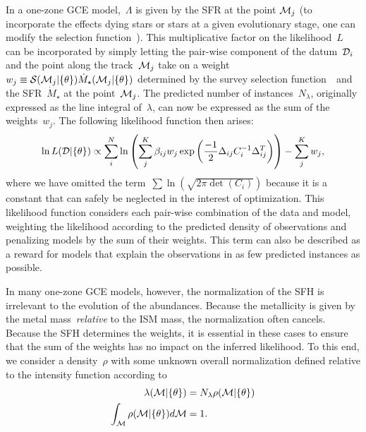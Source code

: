 \documentclass[foo.tex]{subfiles}
\begin{document}
In a one-zone GCE model,~$\Lambda$ is given by the SFR at the point
$\mathcal{M}_j$ (to incorporate the effects dying stars or stars at a given
evolutionary stage, one can modify the selection function~).
This multiplicative factor on the likelihood~$L$ can be incorporated by simply
letting the pair-wise component of the datum~$\mathcal{D}_i$ and the point along
the track~$\mathcal{M}_j$ take on a weight
$w_j \equiv \mathcal{S}(\mathcal{M}_j | \{\theta\}) \dot{M}_\star(\mathcal{M}_j |
\{\theta\})$ determined by the survey selection function~~and the
SFR~$\dot{M}_\star$ at the point~$\mathcal{M}_j$.
The predicted number of instances~$N_\lambda$, originally expressed as the
line integral of~$\lambda$, can now be expressed as the sum of the
weights~$w_j$.
The following likelihood function then arises:
\begin{equation}
\ln L(\mathcal{D} | \{\theta\}) \propto
\sum_i^N \ln \left(\sum_j^K
\beta_{ij} w_j \exp\left(\frac{-1}{2}\Delta_{ij} C_i^{-1} \Delta_{ij}^T\right)
\right) - \sum_j^K w_j,
\label{eq:lnL_minus_weights}
\end{equation}
where we have omitted the term~$\sum \ln \left(\sqrt{2\pi \det{(C_i)}}\right)$
because it is a constant that can safely be neglected in the interest of
optimization.
This likelihood function considers each pair-wise combination of the data and
model, weighting the likelihood according to the predicted density of
observations and penalizing models by the sum of their weights.
This term can also be described as a reward for models that explain the
observations in as few predicted instances as possible.
\par
In many one-zone GCE models, however, the normalization of the SFH is
irrelevant to the evolution of the abundances.
Because the metallicity is given by the metal mass~\textit{relative} to the ISM
mass, the normalization often cancels.
Because the SFH determines the weights, it is essential in these cases to
ensure that the sum of the weights has no impact on the inferred likelihood.
To this end, we consider a density~$\rho$ with some unknown overall
normalization defined relative to the intensity function according to
\begin{subequations}\begin{align}
\lambda(\mathcal{M} | \{\theta\}) &= N_\lambda \rho(\mathcal{M} | \{\theta\})
\\
\int_{\mathcal{M}} \rho(\mathcal{M} | \{\theta\}) d\mathcal{M} &= 1.
\end{align}\end{subequations}
\end{document}
